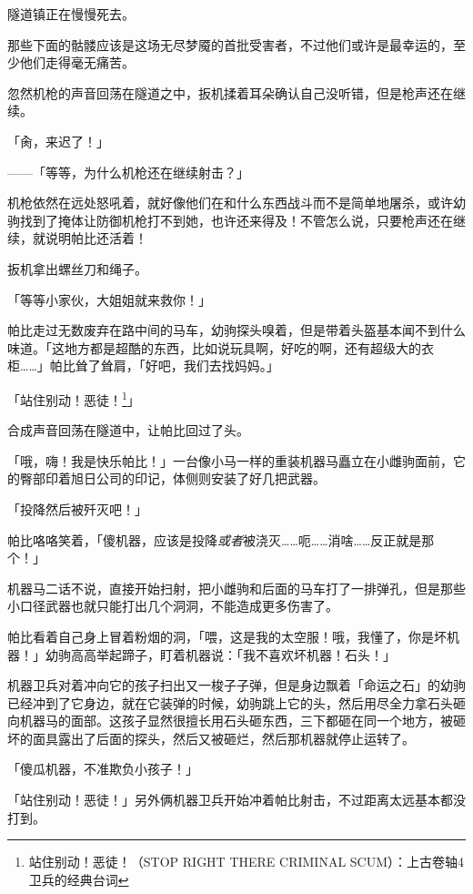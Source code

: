 隧道镇正在慢慢死去。

那些下面的骷髅应该是这场无尽梦魇的首批受害者，不过他们或许是最幸运的，至少他们走得毫无痛苦。

忽然机枪的声音回荡在隧道之中，扳机揉着耳朵确认自己没听错，但是枪声还在继续。

「肏，来迟了！」

——「等等，为什么机枪还在继续射击？」

机枪依然在远处怒吼着，就好像他们在和什么东西战斗而不是简单地屠杀，或许幼驹找到了掩体让防御机枪打不到她，也许还来得及！不管怎么说，只要枪声还在继续，就说明帕比还活着！

扳机拿出螺丝刀和绳子。

「等等小家伙，大姐姐就来救你！」

\horizonline


帕比走过无数废弃在路中间的马车，幼驹探头嗅着，但是带着头盔基本闻不到什么味道。「这地方都是超酷的东西，比如说玩具啊，好吃的啊，还有超级大的衣柜……」帕比耸了耸肩，「好吧，我们去找妈妈。」

「站住别动！恶徒！\footnote{站住别动！恶徒！（STOP RIGHT THERE CRIMINAL SCUM）：上古卷轴4卫兵的经典台词}」

合成声音回荡在隧道中，让帕比回过了头。

「哦，嗨！我是快乐帕比！」一台像小马一样的重装机器马矗立在小雌驹面前，它的臀部印着旭日公司的印记，体侧则安装了好几把武器。

「投降然后被歼灭吧！」

帕比咯咯笑着，「傻机器，应该是投降\emph{或者}被浇灭……呃……消啥……反正就是那个！」

机器马二话不说，直接开始扫射，把小雌驹和后面的马车打了一排弹孔，但是那些小口径武器也就只能打出几个洞洞，不能造成更多伤害了。

帕比看着自己身上冒着粉烟的洞，「喂，这是我的太空服！哦，我懂了，你是坏机器！」幼驹高高举起蹄子，盯着机器说：「我不喜欢坏机器！石头！」

机器卫兵对着冲向它的孩子扫出又一梭子子弹，但是身边飘着「命运之石」的幼驹已经冲到了它身边，就在它装弹的时候，幼驹跳上它的头，然后用尽全力拿石头砸向机器马的面部。这孩子显然很擅长用石头砸东西，三下都砸在同一个地方，被砸坏的面具露出了后面的探头，然后又被砸烂，然后那机器就停止运转了。

「傻瓜机器，不准欺负小孩子！」

「站住别动！恶徒！」另外俩机器卫兵开始冲着帕比射击，不过距离太远基本都没打到。

